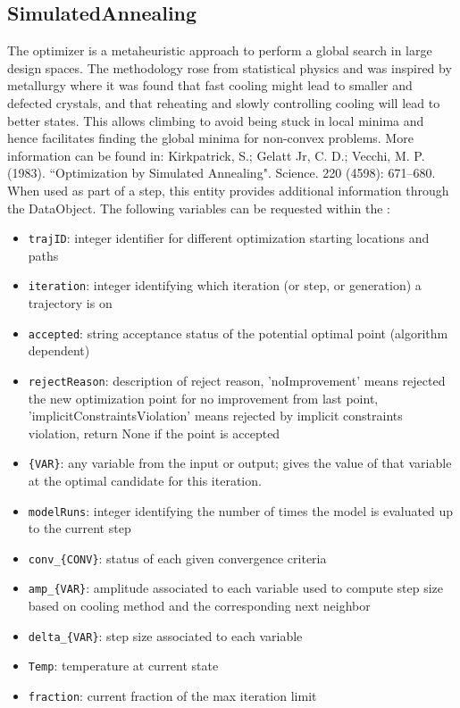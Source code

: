\subsection{SimulatedAnnealing}
  The  optimizer is a metaheuristic approach
  to perform a global search in large design spaces. The methodology rose
  from statistical physics and was inspired by metallurgy where                             it was
  found that fast cooling might lead to smaller and defected crystals,
  and that reheating and slowly controlling cooling will lead to better states.
  This allows climbing to avoid being stuck in local minima and hence facilitates
  finding the global minima for non-convex problems.                             More information
  can be found in: Kirkpatrick, S.; Gelatt Jr, C. D.; Vecchi, M. P. (1983).
  ``Optimization by Simulated Annealing". Science. 220 (4598): 671–680.
\vspace{7pt} \\When used as part of a  step, this entity provides
        additional information through the  DataObject. The
        following variables can be requested within the :
        \begin{itemize}
          \item \texttt{trajID}: integer identifier for different optimization starting locations and paths
             \item \texttt{iteration}: integer identifying which iteration (or step, or generation) a trajectory is on
             \item \texttt{accepted}: string acceptance status of the potential optimal point (algorithm dependent)
             \item \texttt{rejectReason}: description of reject reason, 'noImprovement' means rejected the new optimization point for no improvement from last point, 'implicitConstraintsViolation' means rejected by implicit constraints violation, return None if the point is accepted
             \item \texttt{\{VAR\}}: any variable from the  input or output; gives the value of that variable at the optimal candidate for this iteration.
             \item \texttt{modelRuns}: integer identifying the number of times the model is evaluated up to the current step
             \item \texttt{conv\_\{CONV\}}: status of each given convergence criteria
             \item \texttt{amp\_\{VAR\}}: amplitude associated to each variable used to compute step size based on cooling method and the corresponding next neighbor
             \item \texttt{delta\_\{VAR\}}: step size associated to each variable
             \item \texttt{Temp}: temperature at current state
             \item \texttt{fraction}: current fraction of the max iteration limit

         \end{itemize}

